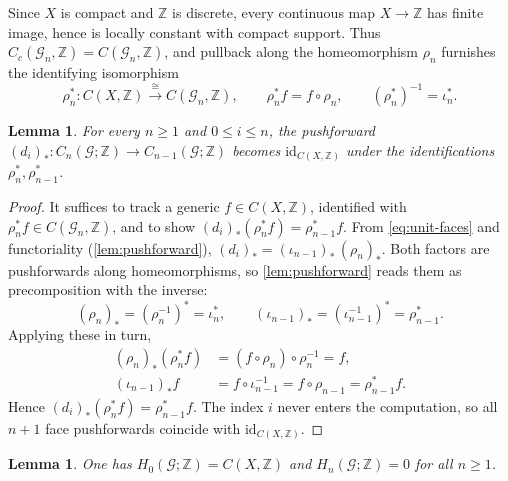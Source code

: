 \documentclass{extracta-temp-26}
\numberwithin{equation}{section}
\newtheorem{lem}[teo]{Lemma}
\theoremstyle{definition}
\theoremstyle{remark}
\newcommand{\G}{\mathcal{G}}
\newcommand{\Z}{\mathbb{Z}}
\newcommand{\id}{\mathrm{id}}
\begin{document}
Since \(X\) is compact and \(\Z\) is discrete, every continuous map \(X\to\Z\) has finite image, hence is locally constant with compact support.
Thus \(C_c(\G_n,\Z)=C(\G_n,\Z)\), and pullback along the homeomorphism \(\rho_n\) furnishes the identifying isomorphism
\begin{equation}\label{eq:rho-iso}
\rho_n^*\colon C(X,\Z)\xrightarrow{\cong}C(\G_n,\Z),
\qquad
\rho_n^*f=f\circ\rho_n,
\qquad
(\rho_n^*)^{-1}=\iota_n^*.
\end{equation}

\begin{lem}\label{lem:faces}
For every \(n\ge 1\) and \(0\le i\le n\), the pushforward \((d_i)_*\colon C_n(\G;\Z)\to C_{n-1}(\G;\Z)\) becomes \(\id_{C(X,\Z)}\) under the identifications \(\rho_n^*,\rho_{n-1}^*\).
\end{lem}

\begin{proof}
It suffices to track a generic \(f\in C(X,\Z)\), identified with \(\rho_n^*f\in C(\G_n,\Z)\), and to show \((d_i)_*(\rho_n^*f)=\rho_{n-1}^*f\).
From \eqref{eq:unit-faces} and functoriality (\cref{lem:pushforward}), \((d_i)_*=(\iota_{n-1})_*\,(\rho_n)_*\).
Both factors are pushforwards along homeomorphisms, so \cref{lem:pushforward} reads them as precomposition with the inverse:
\begin{equation}\label{eq:unit-push-homeo}
(\rho_n)_*=(\rho_n^{-1})^*=\iota_n^*,
\qquad
(\iota_{n-1})_*=(\iota_{n-1}^{-1})^*=\rho_{n-1}^*.
\end{equation}
Applying these in turn,
\begin{equation}\label{eq:unit-push-compute}
\begin{aligned}
(\rho_n)_*(\rho_n^*f)&=(f\circ\rho_n)\circ\rho_n^{-1}=f,\\
(\iota_{n-1})_*f&=f\circ\iota_{n-1}^{-1}=f\circ\rho_{n-1}=\rho_{n-1}^*f.
\end{aligned}
\end{equation}
Hence \((d_i)_*(\rho_n^*f)=\rho_{n-1}^*f\).
The index \(i\) never enters the computation, so all \(n+1\) face pushforwards coincide with \(\id_{C(X,\Z)}\).
\end{proof}

\begin{lem}\label{lem:Moore}
One has \(H_0(\G;\Z)=C(X,\Z)\) and \(H_n(\G;\Z)=0\) for all \(n\ge 1\).
\end{lem}
\end{document}
